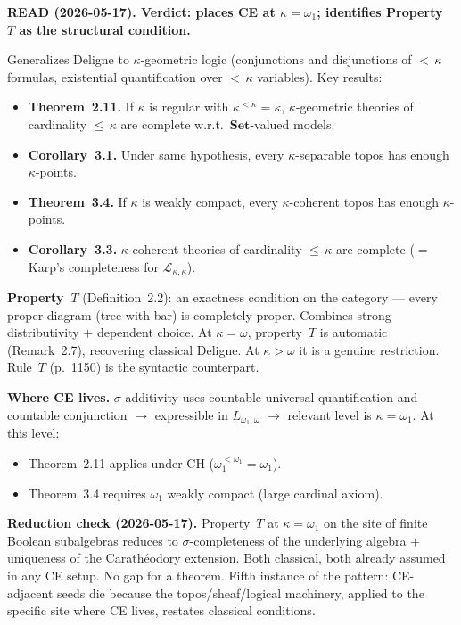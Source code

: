 \textbf{READ (2026-05-17).  Verdict: places CE at $\kappa =
\omega_1$; identifies Property~$T$ as the structural condition.}

\medskip\noindent
Generalizes Deligne to $\kappa$-geometric logic (conjunctions and
disjunctions of ${<}\,\kappa$ formulas, existential quantification
over ${<}\,\kappa$ variables).  Key results:
\begin{itemize}[nosep]
  \item \textbf{Theorem~2.11.}  If $\kappa$ is regular with
    $\kappa^{<\kappa} = \kappa$, $\kappa$-geometric theories of
    cardinality ${\leq}\,\kappa$ are complete w.r.t.\
    $\mathbf{Set}$-valued models.
  \item \textbf{Corollary~3.1.}  Under same hypothesis, every
    $\kappa$-separable topos has enough $\kappa$-points.
  \item \textbf{Theorem~3.4.}  If $\kappa$ is weakly compact, every
    $\kappa$-coherent topos has enough $\kappa$-points.
  \item \textbf{Corollary~3.3.}  $\kappa$-coherent theories of
    cardinality ${\leq}\,\kappa$ are complete ($=$ Karp's
    completeness for $\mathcal{L}_{\kappa,\kappa}$).
\end{itemize}

\medskip\noindent
\textbf{Property~$T$} (Definition~2.2): an exactness condition on
the category --- every proper diagram (tree with bar) is completely
proper.  Combines strong distributivity $+$ dependent choice.  At
$\kappa = \omega$, property~$T$ is automatic (Remark~2.7),
recovering classical Deligne.  At $\kappa > \omega$ it is a genuine
restriction.  Rule~$T$ (p.~1150) is the syntactic counterpart.

\medskip\noindent
\textbf{Where CE lives.}  $\sigma$-additivity uses countable
universal quantification and countable conjunction $\to$
expressible in $L_{\omega_1,\omega}$ $\to$ relevant level is
$\kappa = \omega_1$.  At this level:
\begin{itemize}[nosep]
  \item Theorem~2.11 applies under CH
    ($\omega_1^{<\omega_1} = \omega_1$).
  \item Theorem~3.4 requires $\omega_1$ weakly compact (large
    cardinal axiom).
\end{itemize}

\medskip\noindent
\textbf{Reduction check (2026-05-17).}  Property~$T$ at
$\kappa = \omega_1$ on the site of finite Boolean subalgebras
reduces to $\sigma$-completeness of the underlying algebra $+$
uniqueness of the Carath\'{e}odory extension.  Both classical,
both already assumed in any CE setup.  No gap for a theorem.
Fifth instance of the pattern: CE-adjacent seeds die because
the topos/sheaf/logical machinery, applied to the specific site
where CE lives, restates classical conditions.

